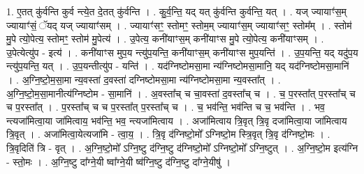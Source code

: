 \documentclass[17pt]{extarticle}
\begin{document}
1. ए॒तत् कु॑र्वन्ति कुर्व न्त्ये॒त दे॒तत् कु॑र्वन्ति । . कु॒र्व॒न्ति॒ यद् यत् कु॑र्वन्ति कुर्वन्ति॒ यत् । . यज् ज्यायाꣳ॑स॒म् ज्यायाꣳ॑सं॒ ॅयद् यज् ज्यायाꣳ॑सम् । . ज्यायाꣳ॑सꣳ॒॒ स्तोमꣳ॒॒ स्तोम॒म् ज्यायाꣳ॑स॒म् ज्यायाꣳ॑सꣳ॒॒ स्तोम᳚म् । . स्तोम॑ मु॒पे त्यो॒पेत्य॒ स्तोमꣳ॒॒ स्तोम॑ मु॒पेत्य॑ । . उ॒पेत्य॒ कनी॑याꣳस॒म् कनी॑याꣳस मु॒पे त्यो॒पेत्य॒ कनी॑याꣳसम् । . उ॒पेत्येत्यु॑प - इत्य॑ । . कनी॑याꣳस मुप॒य न्त्यु॑प॒यन्ति॒ कनी॑याꣳस॒म् कनी॑याꣳस मुप॒यन्ति॑ । . उ॒प॒यन्ति॒ यद् यदु॑प॒य न्त्यु॑प॒यन्ति॒ यत् । . उ॒प॒यन्तीत्यु॑प - यन्ति॑ । . यद॑ग्निष्टोमसा॒मा न्य॑ग्निष्टोमसा॒मानि॒ यद् यद॑ग्निष्टोमसा॒मानि॑ । . अ॒ग्नि॒ष्टो॒म॒सा॒मा न्य॒वस्ता॑ द॒वस्ता॑ दग्निष्टोमसा॒मा न्य॑ग्निष्टोमसा॒मा न्य॒वस्ता᳚त् । . अ॒ग्नि॒ष्टो॒म॒सा॒मानीत्य॑ग्निष्टोम - सा॒मानि॑ । . अ॒वस्ता᳚च् च चा॒वस्ता॑ द॒वस्ता᳚च् च । . च॒ प॒रस्ता᳚त् प॒रस्ता᳚च् च च प॒रस्ता᳚त् । . प॒रस्ता᳚च् च च प॒रस्ता᳚त् प॒रस्ता᳚च् च । . च॒ भव॑न्ति॒ भव॑न्ति च च॒ भव॑न्ति । . भव॒ न्त्यजा॑मित्वा॒या जा॑मित्वाय॒ भव॑न्ति॒ भव॒ न्त्यजा॑मित्वाय । . अजा॑मित्वाय त्रि॒वृत् त्रि॒वृ दजा॑मित्वा॒या जा॑मित्वाय त्रि॒वृत् । . अजा॑मित्वा॒येत्यजा॑मि - त्वा॒य॒ । . त्रि॒वृ द॑ग्निष्टो॒मो᳚ ऽग्निष्टो॒म स्त्रि॒वृत् त्रि॒वृ द॑ग्निष्टो॒मः । . त्रि॒वृदिति॑ त्रि - वृत् । . अ॒ग्नि॒ष्टो॒मो᳚ ऽग्नि॒ष्टु द॑ग्नि॒ष्टु द॑ग्निष्टो॒मो᳚ ऽग्निष्टो॒मो᳚ ऽग्नि॒ष्टुत् । . अ॒ग्नि॒ष्टो॒म इत्य॑ग्नि - स्तो॒मः । . अ॒ग्नि॒ष्टु दा᳚ग्ने॒यी ष्वा᳚ग्ने॒यी ष्व॑ग्नि॒ष्टु द॑ग्नि॒ष्टु दा᳚ग्ने॒यीषु॑ । \newline
\end{document}
